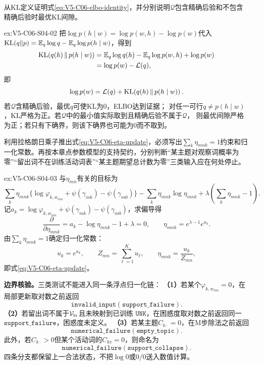 \begin{SLChapterExercisePairSection}
\begin{exercise}\label{ex:V5-C06-S04-02}
从KL定义证明式\eqref{eq:V5-C06-elbo-identity}，并分别说明$\mathcal Q$包含精确后验和不包含精确后验时最优KL间隙。
\end{exercise}
\ifSLFullEdition
{}\label{sol:V5-C06-S04-02}
\begin{chapterexercisesolution}{ex:V5-C06-S04-02}
\nopagebreak[4]
把$\log p(h\mid w)=\log p(w,h)-\log p(w)$代入
$\operatorname{KL}(q\|p)=\mathbb E_q\log q-\mathbb E_q\log p(h\mid w)$，得到
\[
\begin{aligned}
\operatorname{KL}\!\left(q(h)\,\middle\|\,p(h\mid w)\right)
&=\mathbb E_q\log q(h)-\mathbb E_q\log p(w,h)+\log p(w)\\
&=\log p(w)-\mathcal L(q),
\end{aligned}
\]
即
\[
\log p(w)=\mathcal L(q)
+\operatorname{KL}\!\left(q(h)\,\middle\|\,p(h\mid w)\right).
\]
若$\mathcal Q$含精确后验，最优$q$可使KL为0，ELBO达到证据；
对任一可行$q\ne p(h\mid w)$，KL严格为正。若$\mathcal Q$中的最小值实际取到且精确后验不属于$\mathcal Q$，
则最优间隙严格为正；若只有下确界，则该下确界也可能为0而不取到。
\end{chapterexercisesolution}
\fi

\begin{exercise}\label{ex:V5-C06-S04-03}
利用拉格朗日乘子推出式\eqref{eq:V5-C06-eta-update}，必须写出$\sum_k\eta_{mnk}=1$约束和归一化常数。再按本章点参数模型的支持契约，分别判断“某主题对观察词概率为零”“留出词不在训练活动词表”“某主题期望总计数为零”三类输入应在何处停止。
\end{exercise}
\ifSLFullEdition
{}\label{sol:V5-C06-S04-03}
\begin{chapterexercisesolution}{ex:V5-C06-S04-03}
\nopagebreak[4]
与$\eta_{mn}$有关的目标为
\[
\sum_k\eta_{mnk}
\{\log\varphi_{k,w_{mn}}+\psi(\gamma_{mk})-\psi(\gamma_{m0})\}
-\sum_k\eta_{mnk}\log\eta_{mnk}
+\lambda(\sum_k\eta_{mnk}-1).
\]
记$a_k=\log\varphi_{k,w_{mn}}+\psi(\gamma_{mk})-\psi(\gamma_{m0})$，求偏导得
\[
\frac{\partial}{\partial\eta_{mnk}}
=a_k-\log\eta_{mnk}-1+\lambda=0,
\qquad
\eta_{mnk}=e^{\lambda-1}e^{a_k}.
\]
由$\sum_k\eta_{mnk}=1$确定归一化常数：
\[
u_k=e^{a_k},\qquad
Z_{mn}=\sum_{\ell=1}^{K}u_\ell,\qquad
\eta_{mnk}=\frac{u_k}{Z_{mn}},
\]
即式\eqref{eq:V5-C06-eta-update}。

\textbf{边界核验。}三类测试不能进入同一条浮点归一化链：
\textbf{（1）}若某个$\varphi_{k,w_{mn}}=0$，在局部更新取对数之前返回
\[
\mathtt{invalid\_input}(\mathtt{support\_failure}).
\]
\textbf{（2）}若留出词不属于$\mathcal V_{\rm tr}$且未映射到已训练
$\mathtt{UNK}$，在困惑度取对数之前返回同一
$\mathtt{support\_failure}$，困惑度未定义。
\textbf{（3）}若某主题$C_{k\cdot}=0$，在M步除法之前返回
\[
\mathtt{numerical\_failure}(\mathtt{empty\_topic}).
\]
此外，若$C_{k\cdot}>0$但某个活动词的$C_{kv}=0$，则命名为
\[
\mathtt{numerical\_failure}(\mathtt{support\_collapse}).
\]
四条分支都保留上一合法状态，不把$\log0$或$0/0$送入数值计算。
\end{chapterexercisesolution}
\fi


\end{SLChapterExercisePairSection}
